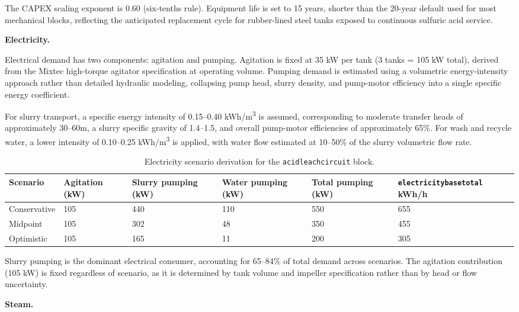 \documentclass{article}
\renewcommand\_{\textunderscore\allowbreak}
\begin{document}
\noindent The CAPEX scaling exponent is 0.60 (six-tenths rule). Equipment life is set to 15 years, shorter than the 20-year default used for most mechanical blocks, reflecting the anticipated replacement cycle for rubber-lined steel tanks exposed to continuous sulfuric acid service.

\medskip
\noindent\textbf{Electricity.}\quad

Electrical demand has two components: agitation and pumping. Agitation is fixed at 35 kW per tank (3 tanks = 105 kW total), derived from the Mixtec high-torque agitator specification at operating volume. Pumping demand is estimated using a volumetric energy-intensity approach rather than detailed hydraulic modeling, collapsing pump head, slurry density, and pump-motor efficiency into a single specific energy coefficient.

For slurry transport, a specific energy intensity of 0.15--0.40 \si{kWh/m^3} is assumed, corresponding to moderate transfer heads of approximately 30--60m, a slurry specific gravity of 1.4--1.5, and overall pump-motor efficiencies of approximately 65\%. For wash and recycle water, a lower intensity of 0.10--0.25 \si{kWh/m^3} is applied, with water flow estimated at 10--50\% of the slurry volumetric flow rate.

\begin{table}[h!]
\caption{Electricity scenario derivation for the \texttt{acid\_leach\_circuit} block.}
\centering
\begin{tabular}{lp{2cm}p{2cm}p{2cm}p{2cm}p{3cm}}
\toprule
\textbf{Scenario} & \textbf{Agitation (kW)} & \textbf{Slurry pumping (kW)} & \textbf{Water pumping (kW)} & \textbf{Total pumping (kW)} & \texttt{electricity\_base\_total} \textbf{kWh/h} \\
\midrule
Conservative & 105 & 440 & 110 & 550 & 655 \\
Midpoint     & 105 & 302 &  48 & 350 & 455 \\
Optimistic   & 105 & 165 &  11 & 200 & 305 \\
\bottomrule
\end{tabular}
\end{table}

\noindent Slurry pumping is the dominant electrical consumer, accounting for 65--84\% of total demand across scenarios. The agitation contribution (105 kW) is fixed regardless of scenario, as it is determined by tank volume and impeller specification rather than by head or flow uncertainty.

\medskip
\noindent\textbf{Steam.}\quad
\end{document}
